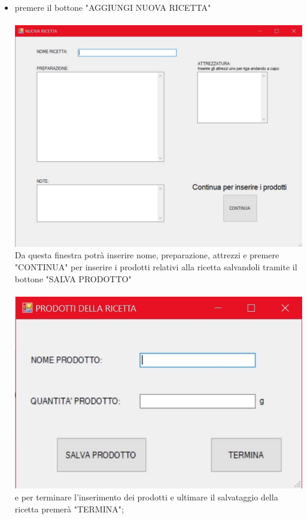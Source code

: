 \documentclass[a4paper, titlepage]{article}
\begin{document}
\begin{itemize}
    \item premere il bottone "AGGIUNGI NUOVA RICETTA"\\\\
    \includegraphics[scale=0.30]{Immagini/form/Form AggiungiRic.jpg}
    \\Da questa finestra potrà inserire nome, preparazione, attrezzi e premere "CONTINUA" per inserire i prodotti relativi alla ricetta salvandoli tramite il bottone "SALVA PRODOTTO"\\\\
    \includegraphics[scale=0.30]{Immagini/form/Form AggiungiProdottiRicetta.jpg}
    \\e per terminare l'inserimento dei prodotti e ultimare il salvataggio della ricetta premerà "TERMINA";

\end{itemize}
\end{document}
